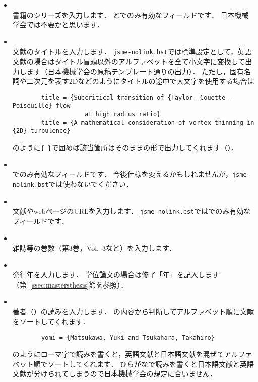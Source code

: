 \documentclass[a4paper,fleqn,uplatex,dvipdfmx]{jsarticle}
\newcommand{\jsmefile}{\texttt{jsme-nolink.bst}}
\begin{document}
\begin{itemize}
        学校名を入力します．
        \ttmastersthesis と\ttphdthesis でのみ有効なフィールドです．
        学部の卒業論文の場合は\ttmisc に分類し，\ttschool フィールドの代わりに\tthowpublished を使用してください．
    \item \ttseries \\
        書籍のシリーズを入力します．
        \ttbook と\ttinbook でのみ有効なフィールドです．
        日本機械学会では不要かと思います．
    \item \tttitle \\
        文献のタイトルを入力します．
        \jsmefile では標準設定として，英語文献の場合はタイトル冒頭以外のアルファベットを全て小文字に変換して出力します（日本機械学会の原稿テンプレート通りの出力）．
        ただし，固有名詞や二次元を表す2Dなどのようにタイトルの途中で大文字を使用する場合は
        \begin{verbatim}
        title = {Subcritical transition of {Taylor--Couette--Poiseuille} flow 
                    at high radius ratio}
        title = {A mathematical consideration of vortex thinning in {2D} turbulence}
        \end{verbatim}
        のように\verb|{ }|で囲めば該当箇所はそのままの形で出力してくれます（\citealp{Matsukawa:PoF2022,Yoneda:arXiv2016}）．
    \item \tttype \\
        \tttechreport でのみ有効なフィールドです．
        今後仕様を変えるかもしれませんが，\jsmefile では使わないでください．
    \item \tturl \\
        文献やwebページのURLを入力します．
        \jsmefile では\ttonline でのみ有効なフィールドです．
    \item \ttvolume \\
        雑誌等の巻数（第3巻，Vol.~3など）を入力します．
    \item \ttyear \\
        発行年を入力します．
        学位論文の場合は修了「年」を記入します（第~\ref{ssec:mastersthesis}節\ttmastersthesis を参照）．
    \item \ttyomi \\
        著者（\ttauthor）の読みを入力します．
        \ttyomi の内容から判断してアルファベット順に文献をソートしてくれます．
        \begin{verbatim}
        yomi = {Matsukawa, Yuki and Tsukahara, Takahiro}
        \end{verbatim}
        のようにローマ字で読みを書くと，英語文献と日本語文献を混ぜてアルファベット順でソートしてくれます．
        ひらがなで読みを書くと日本語文献と英語文献が分けられてしまうので日本機械学会の規定に合いません．
\end{itemize}
\end{document}
